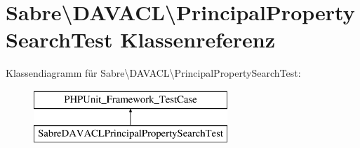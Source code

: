\hypertarget{class_sabre_1_1_d_a_v_a_c_l_1_1_principal_property_search_test}{}\section{Sabre\textbackslash{}D\+A\+V\+A\+CL\textbackslash{}Principal\+Property\+Search\+Test Klassenreferenz}
\label{class_sabre_1_1_d_a_v_a_c_l_1_1_principal_property_search_test}
Klassendiagramm für Sabre\textbackslash{}D\+A\+V\+A\+CL\textbackslash{}Principal\+Property\+Search\+Test\+:\begin{figure}[H]
\begin{center}
\leavevmode
\includegraphics[height=2.000000cm]{class_sabre_1_1_d_a_v_a_c_l_1_1_principal_property_search_test}
\end{center}
\end{figure}
